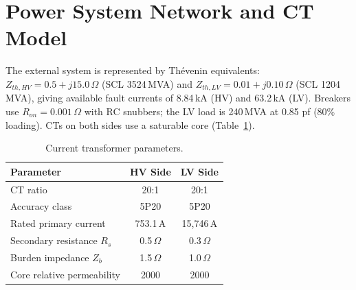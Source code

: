 \documentclass[12pt,a4paper,oneside]{report}
\begin{document}
\section{Power System Network and CT Model}
The external system is represented by Th\'evenin equivalents: $Z_{th,HV}=0.5+j15.0\,\Omega$ (SCL 3524\,MVA) and $Z_{th,LV}=0.01+j0.10\,\Omega$ (SCL 1204\,MVA), giving available fault currents of 8.84\,kA (HV) and 63.2\,kA (LV). Breakers use $R_{on}=0.001\,\Omega$ with RC snubbers; the LV load is 240\,MVA at 0.85 pf (80\% loading). CTs on both sides use a saturable core (Table~\ref{tab:4.2}).
\begin{table}[H]\centering\caption{Current transformer parameters.}\label{tab:4.2}
\begin{tabular}{@{}lcc@{}}\toprule \textbf{Parameter} & \textbf{HV Side} & \textbf{LV Side}\\ \midrule
CT ratio & 20:1 & 20:1\\
Accuracy class & 5P20 & 5P20\\
Rated primary current & 753.1\,A & 15{,}746\,A\\
Secondary resistance $R_s$ & 0.5\,$\Omega$ & 0.3\,$\Omega$\\
Burden impedance $Z_b$ & 1.5\,$\Omega$ & 1.0\,$\Omega$\\
Core relative permeability & 2000 & 2000\\ \bottomrule
\end{tabular}\end{table}
\end{document}

